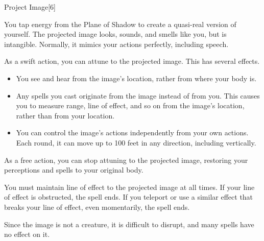 \begin{spellsection}{Project Image}[6]
    \begin{spellheader}
    \end{spellheader}
    \begin{spellcontent}
        \begin{spelltargetinginfo}
            \spellrng{\rngmed}
        \end{spelltargetinginfo}
        \begin{spelleffects}
            \spelleffect You tap energy from the Plane of Shadow to create a quasi-real version of yourself. The projected image looks, sounds, and smells like you, but is intangible. Normally, it mimics your actions perfectly, including speech.
            \par As a swift action, you can attune to the projected image. This has several effects.
            \begin{itemize}
                \item You see and hear from the image's location, rather from where your body is.
                \item Any spells you cast originate from the image instead of from you. This causes you to measure range, line of effect, and so on from the image's location, rather than from your location.
                \item You can control the image's actions independently from your own actions. Each round, it can move up to 100 feet in any direction, including vertically.
            \end{itemize}

            As a free action, you can stop attuning to the projected image, restoring your perceptions and spells to your original body.

            \spelldur \durmed \dismissable
        \end{spelleffects}
    \end{spellcontent}
    \begin{spellfooter}
        \spellnotes You must maintain line of effect to the projected image at all times. If your line of effect is obstructed, the spell ends. If you teleport or use a similar effect that breaks your line of effect, even momentarily, the spell ends.

        Since the image is not a creature, it is difficult to disrupt, and many spells have no effect on it.
        \miscastexplode
    \end{spellfooter}
\end{spellsection}

